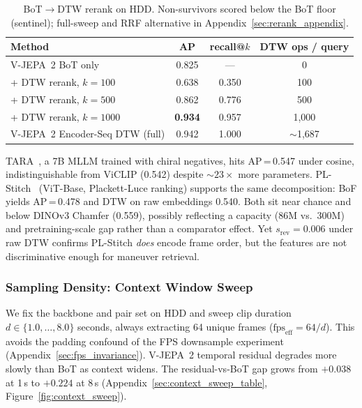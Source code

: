 \documentclass{article}
\theoremstyle{remark}
\begin{document}
\begin{table}[ht]
\centering
\caption{BoT$\to$DTW rerank on HDD. Non-survivors scored below the BoT floor (sentinel); full-sweep and RRF alternative in Appendix~\ref{sec:rerank_appendix}.}
\label{tab:rerank_hdd}
\begin{tabular}{lccc}
\toprule
\textbf{Method} & \textbf{AP} & \textbf{recall@$k$} & \textbf{DTW ops / query} \\
\midrule
V-JEPA~2 BoT only & 0.825 & --- & 0 \\
\; + DTW rerank, $k\!=\!100$ & 0.638 & 0.350 & 100 \\
\; + DTW rerank, $k\!=\!500$ & 0.862 & 0.776 & 500 \\
\; + DTW rerank, $k\!=\!1000$ & \textbf{0.934} & 0.957 & 1{,}000 \\
V-JEPA~2 Encoder-Seq DTW (full) & 0.942 & 1.000 & $\sim$1{,}687 \\
\bottomrule
\end{tabular}
\end{table}

TARA~\cite{tara}, a 7B MLLM trained with chiral negatives, hits AP\,=\,0.547 under cosine, indistinguishable from ViCLIP (0.542) despite ${\sim}23\times$ more parameters. PL-Stitch~\cite{plstitch} (ViT-Base, Plackett-Luce ranking) supports the same decomposition: BoF yields AP\,=\,0.478 and DTW on raw embeddings 0.540. Both sit near chance and below DINOv3 Chamfer (0.559), possibly reflecting a capacity (86M vs.\ 300M) and pretraining-scale gap rather than a comparator effect. Yet $s_\text{rev}\!=\!0.006$ under raw DTW confirms PL-Stitch \emph{does} encode frame order, but the features are not discriminative enough for maneuver retrieval.

\subsubsection{Sampling Density: Context Window Sweep}
\label{sec:context_sweep}

We fix the backbone and pair set on HDD and sweep clip duration $d \in \{1.0, \ldots, 8.0\}$ seconds, always extracting 64 unique frames ($\text{fps}_\text{eff} = 64 / d$). This avoids the padding confound of the FPS downsample experiment (Appendix~\ref{sec:fps_invariance}). V-JEPA~2 temporal residual degrades more slowly than BoT as context widens. The residual-vs-BoT gap grows from $+0.038$ at 1\,s to $+0.224$ at 8\,s (Appendix~\ref{sec:context_sweep_table}, Figure~\ref{fig:context_sweep}).
\end{document}

